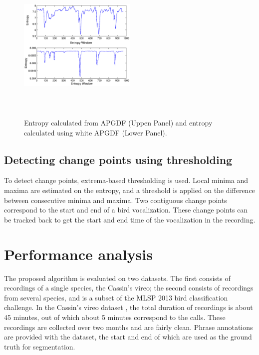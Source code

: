 \documentclass[a4paper]{article}
\begin{document}
\begin{figure}[h]
\centering
\includegraphics[width=0.5\textwidth,height=7.5cm]{Entropy_gd_white_non_white.eps}
\caption{ Entropy calculated from APGDF (Uppen Panel) and entropy calculated using white APGDF (Lower Panel).}
\label{fig:entropy}
\end{figure}



\subsection{Detecting change points using thresholding}
To detect change points, extrema-based thresholding is used. Local minima and
maxima are estimated on the entropy, and a threshold is applied on the
difference between consecutive minima and maxima. Two contiguous change points
correspond to the start and end of a bird vocalization. These change points can
be tracked back to get the start and end time of the vocalization in the
recording.     
   
\section{Performance analysis}


The proposed algorithm is evaluated on two datasets. The first consists of
recordings of a single species, the Cassin's vireo; the second consists of
recordings from several species, and is a subset of the MLSP 2013 bird
classification challenge.
In the Cassin's vireo dataset \cite{data1}, the total duration
of recordings is about 45 minutes, out of which about 5 minutes correspond to
the calls. These recordings are collected over two months and are fairly clean.
Phrase annotations are provided with the dataset, the start and end of which
are used as the ground truth for segmentation. 
\end{document}
